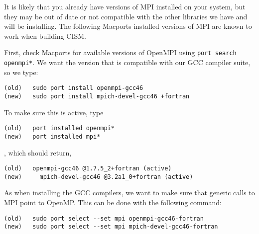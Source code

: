 \begin{mdframed}[style=mac] %
It is likely that you already have versions of MPI installed on your system, 
but they may be out of date or not compatible with the other libraries we have 
and will be installing. The following Macports installed versions of MPI are known 
to work when building  CISM.

%
%
%

First, check Macports for available versions of OpenMPI using \texttt{port search openmpi*}. We want 
the version that is compatible with our GCC compiler suite, so we type: 

\begin{verbatim}
(old)	sudo port install openmpi-gcc46
(new)	sudo port install mpich-devel-gcc46 +fortran
\end{verbatim}

To make sure this is active, type 
\begin{verbatim}
(old)	port installed openmpi*
(new)	port installed mpi*
\end{verbatim}

, which should return, 

\begin{verbatim}
(old)	openmpi-gcc46 @1.7.5_2+fortran (active)
(new)     mpich-devel-gcc46 @3.2a1_0+fortran (active)
\end{verbatim}

As when installing the GCC compilers, we want to make sure that generic calls to MPI point to OpenMP. This 
can be done with the following command:

\begin{verbatim}
(old)	sudo port select --set mpi openmpi-gcc46-fortran
(new)	sudo port select --set mpi mpich-devel-gcc46-fortran
\end{verbatim}


\end{mdframed}
